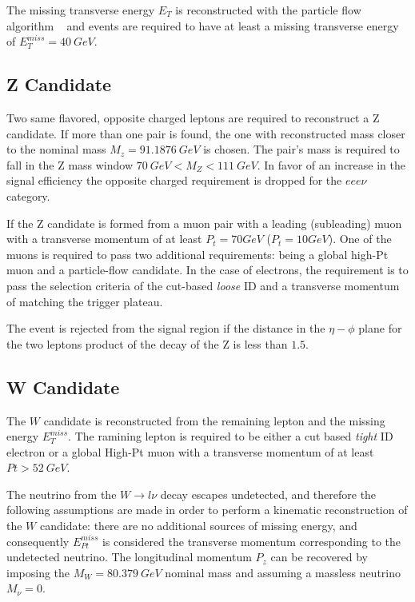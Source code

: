The missing transverse energy $E_T$ is reconstructed with the particle flow
algorithm ~\cite{particleflow} and events are required to have at least a
missing transverse energy of $E_T^{miss}=40~GeV$.

\subsection{Z Candidate}

Two same flavored, opposite charged leptons are required to reconstruct a Z
candidate. If more than one pair is found, the one with reconstructed mass
closer to the nominal mass $M_z=91.1876~GeV$ is chosen. The pair's mass
is required to fall in the Z mass window $70~GeV < M_Z < 111~GeV$. In favor of an
increase in the signal efficiency the opposite charged requirement is dropped
for the $eee\nu$ category.

If the Z candidate is formed from a muon pair with a leading (subleading) muon with
a transverse momentum of at least $P_t=70 GeV$ ($P_t=10GeV$). One of the
muons is required to pass two additional requirements: being a global high-Pt muon and a
particle-flow candidate. In the case of electrons, the requirement is to pass the
selection criteria of the cut-based \emph{loose} ID and a transverse momentum of
matching the trigger plateau.

The event is rejected from the signal region if the distance in the $\eta-\phi$
plane for the two leptons product of the decay of the Z is less than $1.5$.

\subsection{W Candidate}

The $W$ candidate is reconstructed from the remaining lepton and the missing energy
$E_T^{miss}$. The ramining lepton is required to be either a cut based \emph{tight}
ID electron or a global High-Pt muon with a transverse momentum
of at least $Pt>52~GeV$.

The neutrino from the $W \rightarrow l\nu$ decay escapes undetected,
and therefore the following assumptions are made in order to perform a kinematic
reconstruction of the $W$ candidate: there are no additional sources of missing
energy, and consequently $E_{Pt}^{miss}$ is considered the transverse momentum
corresponding to the undetected neutrino. The longitudinal momentum $P_z$ can be
recovered by imposing the $M_W=80.379~GeV $ nominal mass and assuming
a massless neutrino $M_\nu = 0.$

